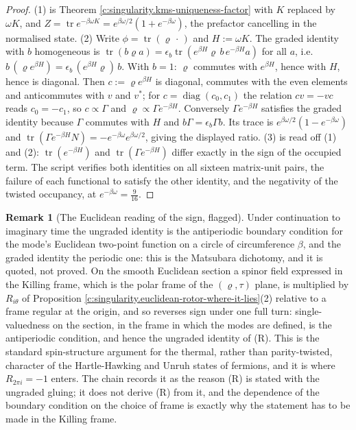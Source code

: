 \documentclass[11pt]{article}
\theoremstyle{definition}
\newtheorem{remark}[theorem]{Remark}
\theoremstyle{plain}
\providecommand{\tr}{}\renewcommand{\tr}{\operatorname{tr}}
\begin{document}
\begin{proof}
(1) is Theorem \ref{c:singularity.kms-uniqueness-factor} with $K$ replaced by $\omega K$, and $Z = \tr e^{-\beta\omega K} = e^{\beta\omega/2}(1 + e^{-\beta\omega})$, the prefactor cancelling in the normalised state. (2) Write $\phi = \tr(\varrho\,\cdot\,)$ and $H := \omega K$. The graded identity with $b$ homogeneous is $\tr(b\varrho a) = \epsilon_b\tr(e^{\beta H}\varrho\,b\,e^{-\beta H}a)$ for all $a$, i.e.\ $b\,(\varrho e^{\beta H}) = \epsilon_b\,(e^{\beta H}\varrho)\,b$. With $b = 1$: $\varrho$ commutes with $e^{\beta H}$, hence with $H$, hence is diagonal. Then $c := \varrho e^{\beta H}$ is diagonal, commutes with the even elements and anticommutes with $v$ and $v^{*}$; for $c = \operatorname{diag}(c_0, c_1)$ the relation $cv = -vc$ reads $c_0 = -c_1$, so $c \propto \Gamma$ and $\varrho \propto \Gamma e^{-\beta H}$. Conversely $\Gamma e^{-\beta H}$ satisfies the graded identity because $\Gamma$ commutes with $H$ and $b\Gamma = \epsilon_b\Gamma b$. Its trace is $e^{\beta\omega/2}(1 - e^{-\beta\omega})$ and $\tr(\Gamma e^{-\beta H}N) = -e^{-\beta\omega}e^{\beta\omega/2}$, giving the displayed ratio. (3) is read off (1) and (2): $\tr(e^{-\beta H}) $ and $\tr(\Gamma e^{-\beta H})$ differ exactly in the sign of the occupied term. The script verifies both identities on all sixteen matrix-unit pairs, the failure of each functional to satisfy the other identity, and the negativity of the twisted occupancy, at $e^{-\beta\omega} = \tfrac{9}{16}$.

\end{proof}

\begin{remark}[The Euclidean reading of the sign, flagged]\label{c:note.singularity.euclidean-reading-sign-flagged}
Under continuation to imaginary time the ungraded identity is the antiperiodic boundary condition for the mode's Euclidean two-point function on a circle of circumference $\beta$, and the graded identity the periodic one: this is the Matsubara dichotomy, and it is quoted, not proved. On the smooth Euclidean section a spinor field expressed in the Killing frame, which is the polar frame of the $(\varrho, \tau)$ plane, is multiplied by $R_{i\theta}$ of Proposition \ref{c:singularity.euclidean-rotor-where-it-lies}(2) relative to a frame regular at the origin, and so reverses sign under one full turn: single-valuedness on the section, in the frame in which the modes are defined, is the antiperiodic condition, and hence the ungraded identity of (R). This is the standard spin-structure argument for the thermal, rather than parity-twisted, character of the Hartle-Hawking and Unruh states of fermions, and it is where $R_{2\pi i} = -1$ enters. The chain records it as the reason (R) is stated with the ungraded gluing; it does not derive (R) from it, and the dependence of the boundary condition on the choice of frame is exactly why the statement has to be made in the Killing frame.
\end{remark}
\end{document}
